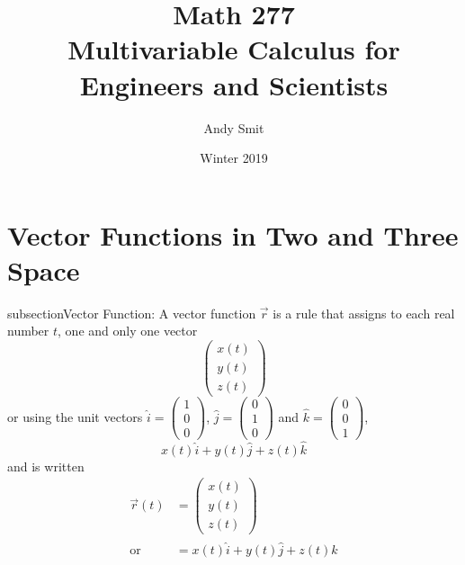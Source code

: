 \documentclass[14pt]{article}
\title{Math 277\\Multivariable Calculus for Engineers and Scientists}
\author{Andy Smit}
\date{Winter 2019}
\begin{document}
    \maketitle
    \section{Vector Functions in Two and Three Space}
    subsection{Vector Function: }
    A vector function $\vec{r}$ is a rule that assigns to each real number $t$, one and only one vector 
    $$\begin{pmatrix}x(t)\\  y(t)\\ z(t)\end{pmatrix}$$
    or using the unit vectors $\hat{i}=\left(\begin{smallmatrix}1\\0\\0\end{smallmatrix}\right)$, $\hat{j}=\left(\begin{smallmatrix}0\\1\\0\end{smallmatrix}\right)$ and $\hat{k}=\left(\begin{smallmatrix}0\\0\\1\end{smallmatrix}\right)$,  
    $$x(t)\hat{i}+y(t)\hat{j}+z(t)\hat{k}$$
    and is written 
    \[
        \begin{split}
            \vec{r}(t) &= \begin{pmatrix}x(t)\\y(t)\\z(t)\end{pmatrix}\\ 
            \text{or\ } &= x(t)\hat{i}+y(t)\hat{j}+z(t)\hat{k}
        \end{split}
    \]
\end{document}
